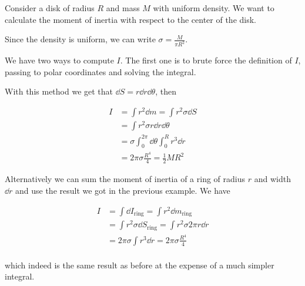 \documentclass[14pt]{extarticle}
\begin{document}
\begin{example}
    Consider a disk of radius $R$ and mass $M$ with uniform density. We want to calculate the moment of inertia with respect to the center of the disk.

    Since the density is uniform, we can write $\sigma = \frac{M}{\pi R^2}$.

    We have two ways to compute $I$. The first one is to brute force the definition of $I$, passing to polar coordinates and solving the integral.

    With this method we get that $\dd{S} = r \dd{r} \dd{\theta}$, then

    \begin{align}
        I & = \int r^2 \dd{m} = \int r^2 \sigma \dd{S}             \\
          & = \int r^2 \sigma r \dd{r} \dd{\theta}                 \\
          & = \sigma \int_0^{2\pi} \dd{\theta} \int_0^R r^3 \dd{r} \\
          & = 2 \pi \sigma \frac{R^4}{4} = \frac{1}{2} M R^2
    \end{align}

    Alternatively we can sum the moment of inertia of a ring of radius $r$ and width $\dd{r}$ and use the result we got in the previous example.
    We have

    \begin{align}
        I & = \int \dd{I_\text{ring}} = \int r^2 \dd{m_\text{ring}}             \\
          & = \int r^2 \sigma \dd{S_\text{ring}}= \int r^2 \sigma 2\pi r \dd{r} \\
          & = 2\pi \sigma \int r^3 \dd{r} = 2\pi \sigma \frac{R^4}{4}           \\
    \end{align}

    which indeed is the same result as before at the expense of a much simpler integral.
\end{example}

\end{document}
